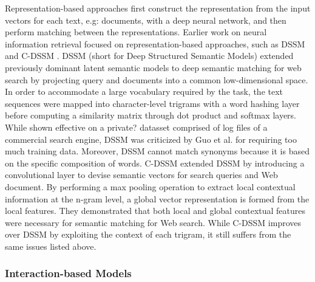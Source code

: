 Representation-based approaches first construct the representation from the input vectors for each text, e.g: documents, with a deep neural network, and then perform matching between the representations.
Earlier work on neural information retrieval focused on representation-based approaches, such as DSSM \cite{huang2013learning} and C-DSSM \cite{shen2014learning}.
DSSM (short for Deep Structured Semantic Models) \cite{huang2013learning} extended previously dominant latent semantic models to deep semantic matching for web search by projecting query and documents into a common low-dimensional space.
In order to accommodate a large vocabulary required by the task, the text sequences were mapped into character-level trigrams with a word hashing layer before computing a similarity matrix through dot product and softmax layers.
While shown effective on a private? datasset comprised of log files of a commercial search engine, DSSM was criticized by Guo et al. \cite{guo2017drmm} for requiring too much training data.
Moreover, DSSM cannot match synonyms because it is based on the specific composition of words.
C-DSSM \cite{shen2014learning} extended DSSM by introducing a convolutional layer to devise semantic vectors for search queries and Web document.
By performing a max pooling operation to extract local contextual information at the n-gram level, a global vector representation is formed from the local features.
They demonstrated that both local and global contextual features were necessary for semantic matching for Web search.
While C-DSSM improves over DSSM by exploiting the context of each trigram, it still suffers from the same issues listed above.

\subsubsection{Interaction-based Models}

